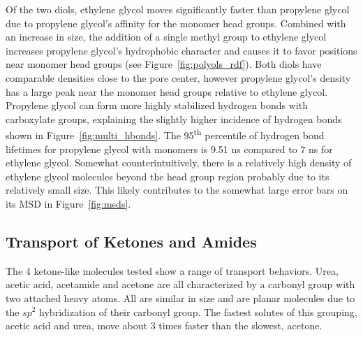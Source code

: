 \documentclass[journal=jpcbfk,manuscript=article]{achemso}
\begin{document}
  Of the two diols, ethylene glycol moves significantly faster than propylene
  glycol due to propylene glycol's affinity for the monomer head groups.
  Combined with an increase in size, the addition of a single methyl group to
  ethylene glycol increases propylene glycol's hydrophobic character and causes
  it to favor positions near monomer head groups (see Figure~\ref{fig:polyols_rdf}).
  Both diols have comparable densities close to the pore center, however propylene
  glycol's density has a large peak near the monomer head groups relative to 
  ethylene glycol. Propylene glycol can form more highly stabilized hydrogen 
  bonds with carboxylate groups, explaining the slightly higher incidence of 
  hydrogen bonds shown in Figure~\ref{fig:multi_hbonds}. The 95\textsuperscript{th}
  percentile of hydrogen bond lifetimes for propylene glycol with monomers is 9.51 ns
  compared to 7 ns for ethylene glycol. 
  Somewhat counterintuitively, there is a 
  relatively high density of ethylene glycol molecules beyond the head group region
  probably due to its relatively small size. This likely contributes to the somewhat
  large error bars on its MSD in Figure~\ref{fig:msds}. 

  \subsection{Transport of Ketones and Amides}
  
  The 4 ketone-like molecules tested show a range of transport behaviors. 
  Urea, acetic acid, acetamide and acetone are all characterized by
  a carbonyl group with two attached heavy atoms. All are similar in size and
  are planar molecules due to the $sp^2$ hybridization of their carbonyl group. 
  The fastest solutes of this grouping, acetic acid and urea, move about 3
  times faster than the slowest, acetone.
  
\end{document}
